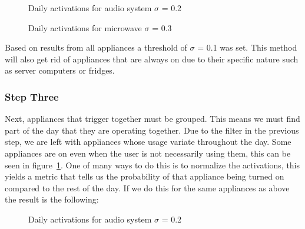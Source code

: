 \begin{figure}[H]
    \centering
    \caption{Daily activations for audio system $\sigma$ = 0.2}
    \label{arr:as_acts}
\end{figure}

\begin{figure}[H]
    \centering
    \caption{Daily activations for microwave $\sigma$ = 0.3}
    \label{arr:microwave_acts}
\end{figure}

Based on results from all appliances a threshold of $\sigma$ = 0.1 was set.
This method will also get rid of appliances that are always on due to their specific nature such as server computers 
or fridges. 

\subsubsection{Step Three}

Next, appliances that trigger together must be grouped. 
This means we must find part of the day that they are operating together.
Due to the filter in the previous step, we are left with appliances whose usage variate throughout the day. 
Some appliances are on even when the user is not necessarily using them, this can be seen in figure \ref{arr:as_acts}.
One of many ways to do this is to normalize the activations, this yields a metric that tells us the probability of that appliance being turned on compared to the rest of the day. 
If we do this for the same appliances as above the result is the following: 

\begin{figure}[H]
    \centering
    \caption{Daily activations for audio system $\sigma$ = 0.2}
    \label{arr:as_acts_norm}
\end{figure}

